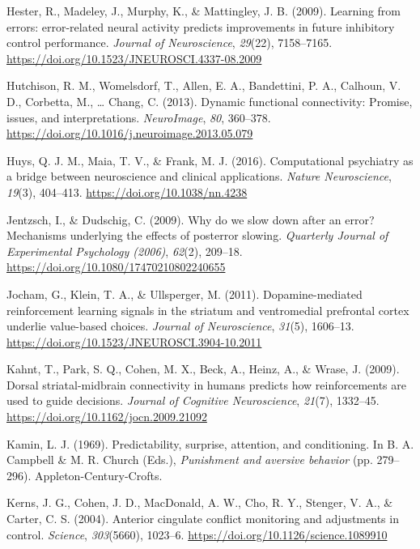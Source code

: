 \documentclass[12pt,openany]{book}
\theoremstyle{definition}
\theoremstyle{definition}
\theoremstyle{definition}
\theoremstyle{remark}
\begin{document}
\hypertarget{ref-Hester2009}{}
Hester, R., Madeley, J., Murphy, K., \& Mattingley, J. B. (2009).
Learning from errors: error-related neural activity predicts
improvements in future inhibitory control performance. \emph{Journal of
Neuroscience}, \emph{29}(22), 7158--7165.
\url{https://doi.org/10.1523/JNEUROSCI.4337-08.2009}

\hypertarget{ref-Hutchison2013}{}
Hutchison, R. M., Womelsdorf, T., Allen, E. A., Bandettini, P. A.,
Calhoun, V. D., Corbetta, M., \ldots{} Chang, C. (2013). Dynamic
functional connectivity: Promise, issues, and interpretations.
\emph{NeuroImage}, \emph{80}, 360--378.
\url{https://doi.org/10.1016/j.neuroimage.2013.05.079}

\hypertarget{ref-Huys2016}{}
Huys, Q. J. M., Maia, T. V., \& Frank, M. J. (2016). Computational
psychiatry as a bridge between neuroscience and clinical applications.
\emph{Nature Neuroscience}, \emph{19}(3), 404--413.
\url{https://doi.org/10.1038/nn.4238}

\hypertarget{ref-Jentzsch2009}{}
Jentzsch, I., \& Dudschig, C. (2009). Why do we slow down after an
error? Mechanisms underlying the effects of posterror slowing.
\emph{Quarterly Journal of Experimental Psychology (2006)},
\emph{62}(2), 209--18. \url{https://doi.org/10.1080/17470210802240655}

\hypertarget{ref-Jocham2011}{}
Jocham, G., Klein, T. A., \& Ullsperger, M. (2011). Dopamine-mediated
reinforcement learning signals in the striatum and ventromedial
prefrontal cortex underlie value-based choices. \emph{Journal of
Neuroscience}, \emph{31}(5), 1606--13.
\url{https://doi.org/10.1523/JNEUROSCI.3904-10.2011}

\hypertarget{ref-Kahnt2009}{}
Kahnt, T., Park, S. Q., Cohen, M. X., Beck, A., Heinz, A., \& Wrase, J.
(2009). Dorsal striatal-midbrain connectivity in humans predicts how
reinforcements are used to guide decisions. \emph{Journal of Cognitive
Neuroscience}, \emph{21}(7), 1332--45.
\url{https://doi.org/10.1162/jocn.2009.21092}

\hypertarget{ref-Kamin1969}{}
Kamin, L. J. (1969). Predictability, surprise, attention, and
conditioning. In B. A. Campbell \& M. R. Church (Eds.), \emph{Punishment
and aversive behavior} (pp. 279--296). Appleton-Century-Crofts.

\hypertarget{ref-Kerns2004}{}
Kerns, J. G., Cohen, J. D., MacDonald, A. W., Cho, R. Y., Stenger, V.
A., \& Carter, C. S. (2004). Anterior cingulate conflict monitoring and
adjustments in control. \emph{Science}, \emph{303}(5660), 1023--6.
\url{https://doi.org/10.1126/science.1089910}
\end{document}
